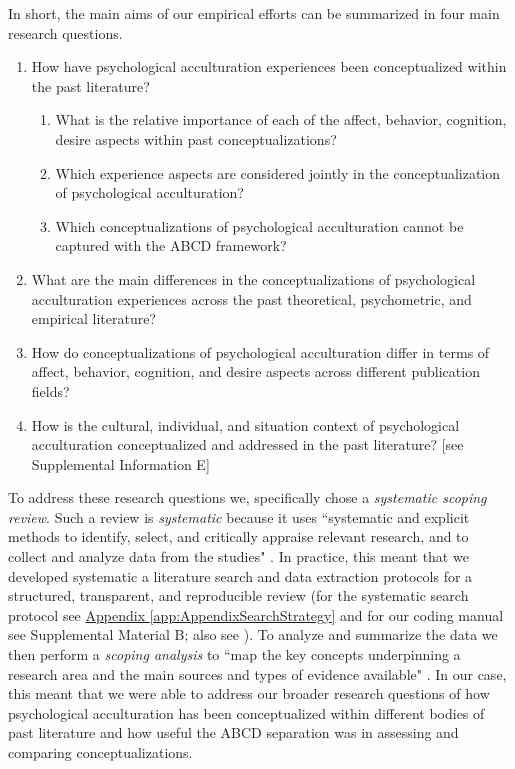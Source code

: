 \documentclass[man, 12pt, a4paper, mask]{apa7}
\newcommand{\appref}[2][]{\hyperref[#2]{Appendix \ref*{#2}#1}}
\begin{document}
In short, the main aims of our empirical efforts can be summarized in four main research questions.
\begin{enumerate}[noitemsep,topsep=0pt,label=RQ \arabic*:,leftmargin=1.8cm]
    \item How have psychological acculturation experiences been conceptualized within the past literature?
    \begin{enumerate}[noitemsep,topsep=0pt,label=(RQ 1\alph*):,leftmargin=1.64cm]
        \item What is the relative importance of each of the affect, behavior, cognition, desire aspects within past conceptualizations?
        \item Which experience aspects are considered jointly in the conceptualization of psychological acculturation?
        \item Which conceptualizations of psychological acculturation cannot be captured with the ABCD framework?
    \end{enumerate}
    \item What are the main differences in the conceptualizations of psychological acculturation experiences across the past theoretical, psychometric, and empirical literature?
    \item How do conceptualizations of psychological acculturation differ in terms of affect, behavior, cognition, and desire aspects across different publication fields?
    \item How is the cultural, individual, and situation context of psychological acculturation conceptualized and addressed in the past literature? [see Supplemental Information E]
\end{enumerate}

To address these research questions we, specifically chose a \textit{systematic scoping review}. Such a review is \textit{systematic} because it uses ``systematic and explicit methods to identify, select, and critically appraise relevant research, and to collect and analyze data from the studies" \citep[PRISMA guidelines; ][p. 1]{Moher2009}. In practice, this meant that we developed systematic a literature search and data extraction protocols for a structured, transparent, and reproducible review (for the systematic search protocol see \appref{app:AppendixSearchStrategy} and for our coding manual see Supplemental Material B; also see \citealp{Peters2015}). To analyze and summarize the data we then perform a \textit{scoping analysis} to ``map the key concepts underpinning a research area and the main sources and types of evidence available" \citep[][p.21]{Arksey2005}. In our case, this meant that we were able to address our broader research questions of how psychological acculturation has been conceptualized within different bodies of past literature and how useful the ABCD separation was in assessing and comparing conceptualizations.
\end{document}
